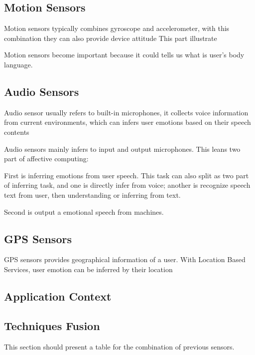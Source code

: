 \subsection{Motion Sensors}\label{subsec:motion}
Motion sensors typically combines gyroscope and accelerometer, with this combination they can also provide device attitude
This part illustrate \cite{Rana, Mottelson2016, Bailenson2007}

Motion sensors become important because it could tells us what is user's body language.

\subsection{Audio Sensors}\label{subsec:audio}
Audio sensor usually refers to built-in microphones, it collects voice information from current environments, which can infers user emotions based on their speech contents

Audio sensors mainly infers to input and output microphones. This leans two part of affective computing:

First is inferring emotions from user speech. 
This task can also split as two part of inferring task, and one is directly infer from voice;
another is recognize speech text from user, then understanding or inferring from text.

Second is output a emotional speech from machines.

\subsection{GPS Sensors}\label{subsec:gps}
GPS sensors provides geographical information of a user. With Location Based Services, user emotion can be inferred by their location

\subsection{Application Context}\label{subsec:ui}

\subsection{Techniques Fusion}\label{subsec:fusion}


This section should present a table for the combination of previous sensors.
